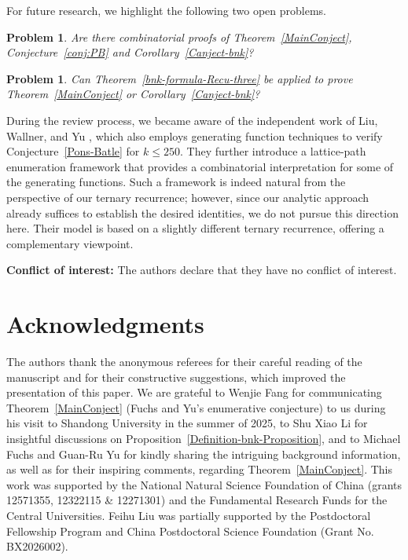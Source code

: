 \documentclass[reqno, 12pt]{article}
\theoremstyle{mydefinition}
\theoremstyle{myremark}
\newtheorem{prob}[thm]{Problem}
\numberwithin{algorithm}{section}
\begin{document}
For future research, we highlight the following two open problems.
\begin{prob}
Are there combinatorial proofs of Theorem~\ref{MainConject}, Conjecture~\ref{conj:PB} and Corollary~\ref{Canject-bnk}?
\end{prob}

\begin{prob}
Can Theorem~\ref{bnk-formula-Recu-three} be applied to prove Theorem~\ref{MainConject} or Corollary~\ref{Canject-bnk}?
\end{prob}


During the review process, we became aware of the independent work of Liu, Wallner, and Yu \cite{Liu-Wallner-Yu}, which also employs generating function techniques to verify Conjecture~\ref{Pons-Batle} for $k\leq 250$.
They further introduce a lattice-path enumeration framework that provides a combinatorial interpretation for some of the generating functions.
Such a framework is indeed natural from the perspective of our ternary recurrence; however, since our analytic approach already suffices to establish the desired identities, we do not pursue this direction here.
Their model is based on a slightly different ternary recurrence, offering a complementary viewpoint.


\noindent\textbf{Conflict of interest:} The authors declare that they have no conflict of interest.





\section*{Acknowledgments}
The authors thank the anonymous referees for their careful reading of the manuscript and for their constructive suggestions, which improved the presentation of this paper.
We are grateful to Wenjie Fang for communicating Theorem~\ref{MainConject} (Fuchs and Yu's enumerative conjecture)  to us during his visit to Shandong University in the summer of 2025, to Shu Xiao Li for insightful discussions on Proposition~\ref{Definition-bnk-Proposition}, and to Michael Fuchs and Guan-Ru Yu for kindly sharing the intriguing background information, as well as for their inspiring comments, regarding  Theorem~\ref{MainConject}.
This work was supported by the National Natural Science Foundation of China (grants
12571355, 12322115 \& 12271301) and the Fundamental Research Funds for
the Central Universities.
Feihu Liu was partially supported by the Postdoctoral Fellowship Program and China Postdoctoral Science Foundation (Grant No. BX2026002).
\end{document}
